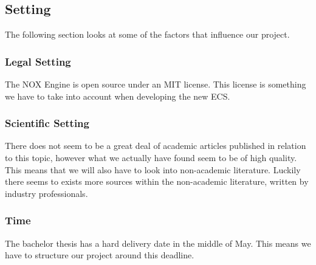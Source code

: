 \subsection{Setting}
The following section looks at some of the factors that influence our project.

\subsubsection{Legal Setting}
The NOX Engine is open source under an MIT license. 
This license is something we have to take into account when developing the new ECS.

\subsubsection{Scientific Setting}
There does not seem to be a great deal of academic articles published in relation to this topic,
however what we actually have found seem to be of high quality.
This means that we will also have to look into non-academic literature. 
Luckily there seems to exists more sources within the non-academic literature, 
written by industry professionals.

\subsubsection{Time}
The bachelor thesis has a hard delivery date in the middle of May. 
This means we have to structure our project around this deadline.